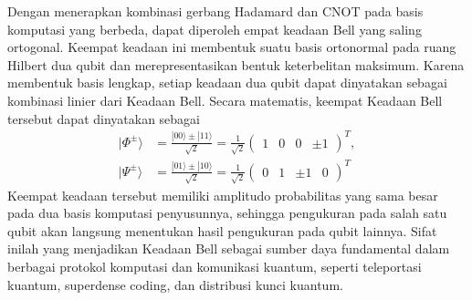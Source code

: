 Dengan menerapkan kombinasi gerbang Hadamard dan CNOT pada basis komputasi yang berbeda, dapat diperoleh empat keadaan Bell yang saling ortogonal. Keempat keadaan ini membentuk suatu basis ortonormal pada ruang Hilbert dua qubit dan merepresentasikan bentuk keterbelitan maksimum. Karena membentuk basis lengkap, setiap keadaan dua qubit dapat dinyatakan sebagai kombinasi linier dari Keadaan Bell. Secara matematis, keempat Keadaan Bell tersebut dapat dinyatakan sebagai
\begin{equation}
    \label{eq:bell_state_3}
    \begin{split}
        |\Phi^{\pm}\rangle &= \frac{|00\rangle \pm |11\rangle}{\sqrt{2}} = \frac{1}{\sqrt{2}} \begin{pmatrix} 1 & 0 & 0 & \pm 1 \end{pmatrix}^T, \\
        |\Psi^{\pm}\rangle &= \frac{|01\rangle \pm |10\rangle}{\sqrt{2}} = \frac{1}{\sqrt{2}} \begin{pmatrix} 0 & 1 & \pm 1 & 0 \end{pmatrix}^T
    \end{split}
\end{equation}
Keempat keadaan tersebut memiliki amplitudo probabilitas yang sama besar pada dua basis komputasi penyusunnya, sehingga pengukuran pada salah satu qubit akan langsung menentukan hasil pengukuran pada qubit lainnya. Sifat inilah yang menjadikan Keadaan Bell sebagai sumber daya fundamental dalam berbagai protokol komputasi dan komunikasi kuantum, seperti teleportasi kuantum, superdense coding, dan distribusi kunci kuantum.

